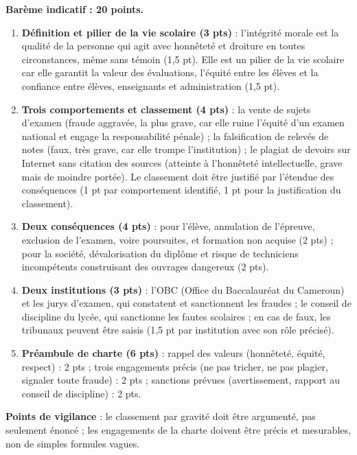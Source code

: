 \documentclass[11pt]{article}
\begin{document}
\begin{corrige}
\textbf{Barème indicatif : 20 points.}

\begin{enumerate}
\item \textbf{Définition et pilier de la vie scolaire (3 pts)} : l'intégrité morale est la qualité de la personne qui agit avec honnêteté et droiture en toutes circonstances, même sans témoin (1,5 pt). Elle est un pilier de la vie scolaire car elle garantit la valeur des évaluations, l'équité entre les élèves et la confiance entre élèves, enseignants et administration (1,5 pt).
\item \textbf{Trois comportements et classement (4 pts)} : la vente de sujets d'examen (fraude aggravée, la plus grave, car elle ruine l'équité d'un examen national et engage la responsabilité pénale) ; la falsification de relevés de notes (faux, très grave, car elle trompe l'institution) ; le plagiat de devoirs sur Internet sans citation des sources (atteinte à l'honnêteté intellectuelle, grave mais de moindre portée). Le classement doit être justifié par l'étendue des conséquences (1 pt par comportement identifié, 1 pt pour la justification du classement).
\item \textbf{Deux conséquences (4 pts)} : pour l'élève, annulation de l'épreuve, exclusion de l'examen, voire poursuites, et formation non acquise (2 pts) ; pour la société, dévalorisation du diplôme et risque de techniciens incompétents construisant des ouvrages dangereux (2 pts).
\item \textbf{Deux institutions (3 pts)} : l'OBC (Office du Baccalauréat du Cameroun) et les jurys d'examen, qui constatent et sanctionnent les fraudes ; le conseil de discipline du lycée, qui sanctionne les fautes scolaires ; en cas de faux, les tribunaux peuvent être saisis (1,5 pt par institution avec son rôle précisé).
\item \textbf{Préambule de charte (6 pts)} : rappel des valeurs (honnêteté, équité, respect) : 2 pts ; trois engagements précis (ne pas tricher, ne pas plagier, signaler toute fraude) : 2 pts ; sanctions prévues (avertissement, rapport au conseil de discipline) : 2 pts.
\end{enumerate}
\textbf{Points de vigilance} : le classement par gravité doit être argumenté, pas seulement énoncé ; les engagements de la charte doivent être précis et mesurables, non de simples formules vagues.
\end{corrige}
\end{document}
